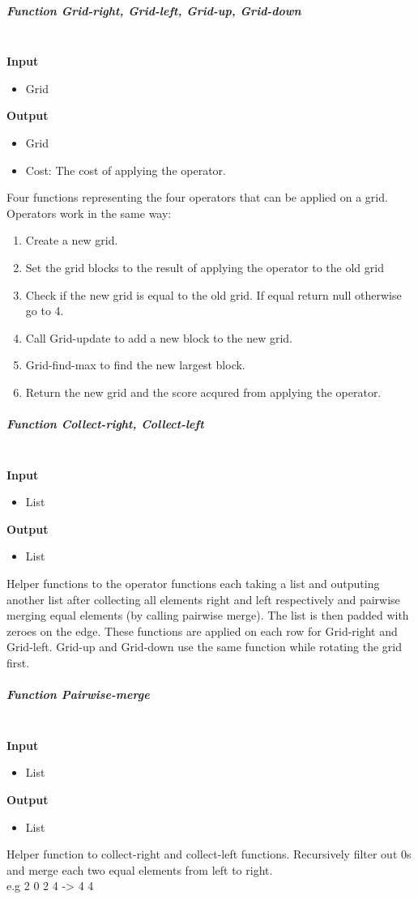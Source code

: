\documentclass[paper=a4, fontsize=11pt]{scrartcl}
\numberwithin{equation}{section}		%
\numberwithin{figure}{section}			%
\numberwithin{table}{section}				%
\begin{document}
\subparagraph{Function Grid-right, Grid-left, Grid-up, Grid-down } \mbox{} \\
\noindent\textbf{Input}
\begin{itemize}
    \item Grid
\end{itemize}
\noindent\textbf{Output}
\begin{itemize}
    \item Grid
    \item Cost: The cost of applying the operator.
\end{itemize}
Four functions representing the four operators that can be applied on a grid. Operators work in the same way:
\begin{enumerate}
	\item Create a new grid.
    \item Set the grid blocks to the result of applying the operator to the old grid
    \item Check if the new grid is equal to the old grid. If equal return null otherwise go to 4.
    \item Call Grid-update to add a new block to the new grid.
    \item Grid-find-max to find the new largest block.
    \item Return the new grid and the score acqured from applying the operator.
\end{enumerate}

\subparagraph{Function Collect-right, Collect-left } \mbox{} \\
\noindent\textbf{Input}
\begin{itemize}
    \item List
\end{itemize}
\noindent\textbf{Output}
\begin{itemize}
    \item List
\end{itemize}
Helper functions to the operator functions each taking a list and outputing another list after collecting all elements right and left respectively and pairwise merging equal elements (by calling pairwise merge). The list is then padded with zeroes on the edge. These functions are applied on each row for Grid-right and Grid-left. Grid-up and Grid-down use the same function while rotating the grid first.

\subparagraph{Function Pairwise-merge } \mbox{} \\
\noindent\textbf{Input}
\begin{itemize}
    \item List
\end{itemize}
\noindent\textbf{Output}
\begin{itemize}
    \item List
\end{itemize}
Helper function to collect-right and collect-left functions. Recursively filter out 0s and merge each two equal elements from left to right. \\
e.g 2 0 2 4 -> 4 4
\end{document}
